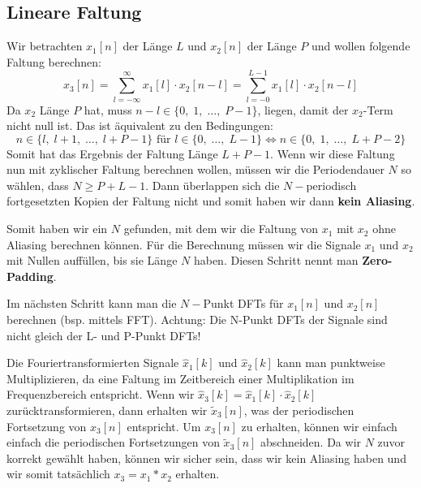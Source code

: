\documentclass[11pt]{article}
\begin{document}
\subsection*{Lineare Faltung}
\vspace*{-0.5cm}
Wir betrachten $x_1[n]$ der Länge $L$ und $x_2[n]$ der Länge $P$ und wollen folgende Faltung berechnen:
$$ x_3[n] = \sum_{l=-\infty}^\infty x_1[l]\cdot x_2[n-l] = \sum_{l=-0}^{L-1} x_1[l]\cdot x_2[n-l] $$
Da $x_2$ Länge $P$ hat, muss $n-l \in \{ 0, \; 1, \; \dots, \; P-1 \}$, liegen, damit der $x_2$-Term nicht null ist. Das ist äquivalent zu den Bedingungen:
$$ n \in \{l, \; l+1, \; \dots , \; l+P-1\} \text{ für } l \in \{ 0, \; \dots, \; L-1 \} \Leftrightarrow n \in \{0, \; 1, \; \dots, \; L+P-2\}$$
Somit hat das Ergebnis der Faltung Länge $L+P-1$. Wenn wir diese Faltung nun mit zyklischer Faltung berechnen wollen, müssen wir die Periodendauer $N$ so wählen, dass $N \geq P + L -1$. Dann überlappen sich die $N-$periodisch fortgesetzten Kopien der Faltung nicht und somit haben wir dann \textbf{kein Aliasing}.

Somit haben wir ein $N$ gefunden, mit dem wir die Faltung von $x_1$ mit $x_2$ ohne Aliasing berechnen können. Für die Berechnung müssen wir die Signale $x_1$ und $x_2$ mit Nullen auffüllen, bis sie Länge $N$ haben. Diesen Schritt nennt man \textbf{Zero-Padding}.

Im nächsten Schritt kann man die $N-$Punkt DFTs für $x_1[n]$ und $x_2[n]$ berechnen (bsp. mittels FFT). \textcolor{myred}{Achtung: Die N-Punkt DFTs der Signale sind nicht gleich der L- und P-Punkt DFTs!}

Die Fouriertransformierten Signale $\hat{x}_1[k]$ und $\hat{x}_2[k]$ kann man punktweise Multiplizieren, da eine Faltung im Zeitbereich einer Multiplikation im Frequenzbereich entspricht. Wenn wir $\hat{x}_3[k] = \hat{x}_1[k] \cdot \hat{x}_2[k]$ zurücktransformieren, dann erhalten wir $\tilde{x}_3[n]$, was der periodischen Fortsetzung von $x_3[n]$ entspricht. Um $x_3[n]$ zu erhalten, können wir einfach einfach die periodischen Fortsetzungen von $\tilde{x}_3[n]$ abschneiden. Da wir $N$ zuvor korrekt gewählt haben, können wir sicher sein, dass wir kein Aliasing haben und wir somit tatsächlich $x_3 = x_1 \ast x_2$ erhalten.
\end{document}
